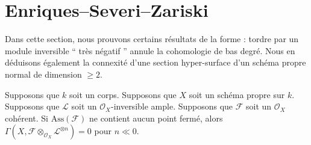 \section{Enriques--Severi--Zariski}
\label{section-vanishing-negative}

\noindent
Dans cette section, nous prouvons certains résultats
de la forme : tordre par un module inversible `` très
négatif '' annule la cohomologie de bas degré. Nous en
déduisons également la connexité d'une section
hyper-surface d'un schéma propre normal de dimension $\geq 2$.

\begin{lemma}
\label{lemma-vanishin-h0-negative}
Supposons que $k$ soit un corps. Supposons que $X$ soit un
schéma propre sur $k$. Supposons que $\mathcal{L}$ soit un
$\mathcal{O}_X$-inversible ample. Supposons que $\mathcal{F}$
soit un $\mathcal{O}_X$ cohérent. Si $\text{Ass}(\mathcal{F})$
ne contient aucun point fermé, alors $\Gamma(X, \mathcal{F}
\otimes_{\mathcal{O}_X} \mathcal{L}^{\otimes n}) = 0$ pour $n \ll 0$.
\end{lemma}

